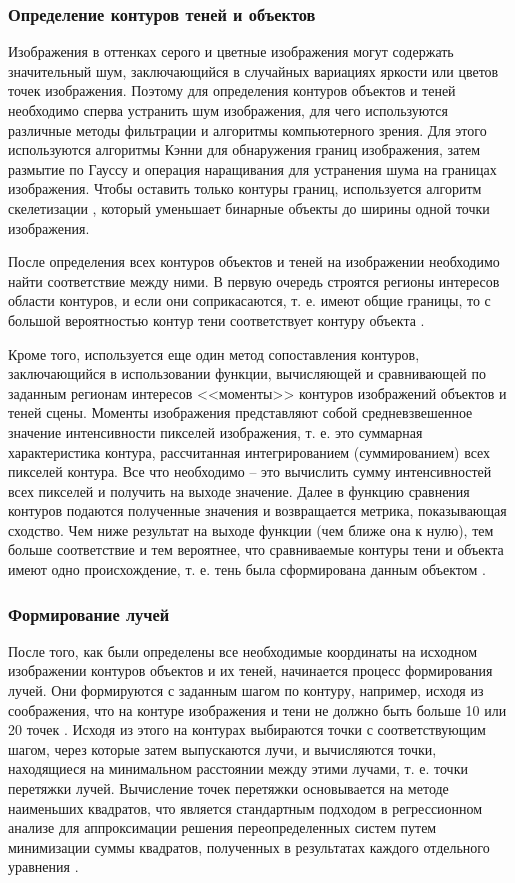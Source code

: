 \subsubsection*{Определение контуров теней и объектов}

Изображения в оттенках серого и цветные изображения могут содержать значительный шум, заключающийся в случайных вариациях яркости или цветов точек изображения. Поэтому для определения контуров объектов и теней необходимо сперва устранить шум изображения, для чего используются различные методы фильтрации и алгоритмы компьютерного зрения. Для этого используются алгоритмы Кэнни \cite{canedgedetect} для обнаружения границ изображения, затем размытие по Гауссу \cite{gaus_smooth} и операция наращивания \cite{dilation} для устранения шума на границах изображения. Чтобы оставить только контуры границ, используется алгоритм скелетизации \cite{skeleton}, который уменьшает бинарные объекты до ширины одной точки изображения. 

После определения всех контуров объектов и теней на изображении необходимо найти соответствие между ними. В первую очередь строятся регионы интересов \cite{roi} области контуров, и если они соприкасаются, т. е. имеют общие границы, то с большой вероятностью контур тени соответствует контуру объекта \cite{sns_tras}.

Кроме того, используется еще один метод сопоставления контуров, заключающийся в использовании функции, вычисляющей и сравнивающей по заданным регионам интересов <<моменты>> контуров изображений объектов и теней сцены. Моменты изображения представляют собой средневзвешенное значение интенсивности пикселей изображения, т. е. это суммарная характеристика контура, рассчитанная интегрированием (суммированием) всех пикселей контура. Все что необходимо -- это вычислить сумму интенсивностей всех пикселей и получить на выходе значение. Далее в функцию сравнения контуров подаются полученные значения и возвращается метрика, показывающая сходство. Чем ниже результат на выходе функции (чем ближе она к нулю), тем больше соответствие и тем вероятнее, что сравниваемые контуры тени и объекта имеют одно происхождение, т. е. тень была сформирована данным объектом \cite{sns_tras}.

\subsubsection*{Формирование лучей}

После того, как были определены все необходимые координаты на исходном изображении контуров объектов и их теней, начинается процесс формирования лучей. Они формируются с заданным шагом по контуру, например, исходя из соображения, что на контуре изображения и тени не должно быть больше 10 или 20 точек \cite{sns_tras}. Исходя из этого на контурах выбираются точки с соответствующим шагом, через которые затем выпускаются лучи, и вычисляются точки, находящиеся на минимальном расстоянии между этими лучами, т. е. точки перетяжки лучей. Вычисление точек перетяжки основывается на методе наименьших квадратов, что является стандартным подходом в регрессионном анализе для аппроксимации решения переопределенных систем путем минимизации суммы квадратов, полученных в результатах каждого отдельного уравнения \cite{mnk}.

